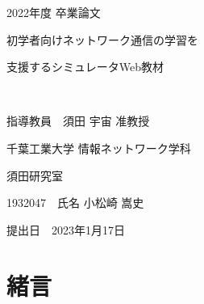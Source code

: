 \documentclass[12pt,a4j,titlepage]{ltjsarticle}
\begin{document}
\begin{titlepage}
  \begin{center}
  
    \vspace*{20truept}
    
    {\LARGE 2022年度 卒業論文}
    
    \vspace*{75truept}
    
    {\Huge 初学者向けネットワーク通信の学習を}　%

    \vspace{10truept}

    {\Huge 支援するシミュレータWeb教材 }　%

    \vspace{10truept}

    {\Huge }　%

    \vspace{85truept}
    
    {\LARGE 指導教員　須田 宇宙 准教授}
    
    \vspace{60truept}
    
    {\LARGE 千葉工業大学 情報ネットワーク学科}
    
    \vspace{15truept}
    
    {\LARGE 須田研究室}
    
    \vspace{70truept}
    
    {\LARGE 1932047　氏名 小松崎 嵩史 }　%

    \vspace{70truept}
    
  \end{center}
  \begin{flushright}

    {\LARGE 提出日　2023年1月17日}
  
  \end{flushright}
\end{titlepage}
\setcounter{page}{0}\pagestyle{plain}
\tableofcontents
\listoftables
\listoffigures

\clearpage
\setcounter{page}{0}
\section{緒言}
\end{document}
